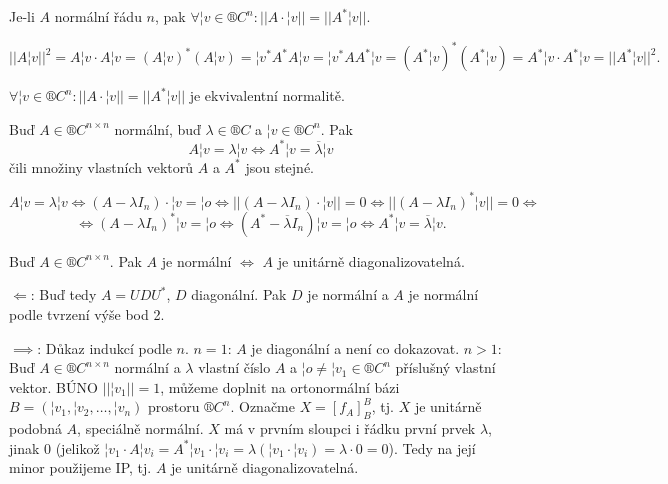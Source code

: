 \documentclass[12pt]{article}                   %
\begin{document}
    \begin{tvrzeni}
        Je-li $A$ normální řádu $n$, pak $\forall ¦v \in ®C^n: ||A·¦v|| = ||A^*¦v||$.

        \begin{dukazin}
                $$ ||A¦v||^2 = A¦v·A¦v = (A¦v)^*(A¦v) = ¦v^*A^*A¦v = ¦v^*AA^*¦v = (A^*¦v)^*(A^*¦v) = A^*¦v·A^*¦v = ||A^*¦v||^2. $$ 
        \end{dukazin}
    \end{tvrzeni}

    \begin{poznamka}
        $\forall ¦v \in ®C^n: ||A·¦v|| = ||A^*¦v||$ je ekvivalentní normalitě.
    \end{poznamka}

    \begin{tvrzeni}
        Buď $A \in ®C^{n \times n}$ normální, buď $\lambda \in ®C$ a $¦v \in ®C^n$. Pak
        $$ A¦v = \lambda¦v \Leftrightarrow A^*¦v = \overline{\lambda}¦v $$ 
        čili množiny vlastních vektorů $A$ a $A^*$ jsou stejné.

        \begin{dukazin}
            $$ A¦v = \lambda ¦v \Leftrightarrow (A - \lambda I_n)·¦v = ¦o \Leftrightarrow ||(A - \lambda I_n)·¦v|| = 0 \Leftrightarrow ||(A - \lambda I_n)^*¦v|| = 0 \Leftrightarrow $$
            $$ \Leftrightarrow (A - \lambda I_n)^*¦v = ¦o \Leftrightarrow (A^* - \overline{\lambda}I_n)¦v = ¦o \Leftrightarrow A^*¦v = \overline{\lambda}¦v. $$
        \end{dukazin}
    \end{tvrzeni}

    \begin{veta}
        Buď $A \in ®C^{n \times n}$. Pak $A$ je normální $\Leftrightarrow$ $A$ je unitárně diagonalizovatelná.

        \begin{dukazin}
            $\Leftarrow$: Buď tedy $A = UDU^*$, $D$ diagonální. Pak $D$ je normální a $A$ je normální podle tvrzení výše bod 2.

            $\implies$: Důkaz indukcí podle $n$. $n = 1$: $A$ je diagonální a není co dokazovat. $n > 1:$ Buď $A \in ®C^{n \times n}$ normální a $\lambda$ vlastní číslo $A$ a $¦o ≠ ¦v_1 \in ®C^n$ příslušný vlastní vektor. BÚNO $||¦v_1|| = 1$, můžeme doplnit na ortonormální bázi $B = (¦v_1, ¦v_2, …, ¦v_n)$ prostoru $®C^n$. Označme $X = [f_A]_B^B$, tj. $X$ je unitárně podobná $A$, speciálně normální. $X$ má v prvním sloupci i řádku první prvek $\lambda$, jinak 0 (jelikož $¦v_1·A¦v_i = A^*¦v_1·¦v_i = \lambda(¦v_1·¦v_i) = \lambda·0 = 0$). Tedy na její minor použijeme IP, tj. $A$ je unitárně diagonalizovatelná.
        \end{dukazin}
    \end{veta}
\end{document}
